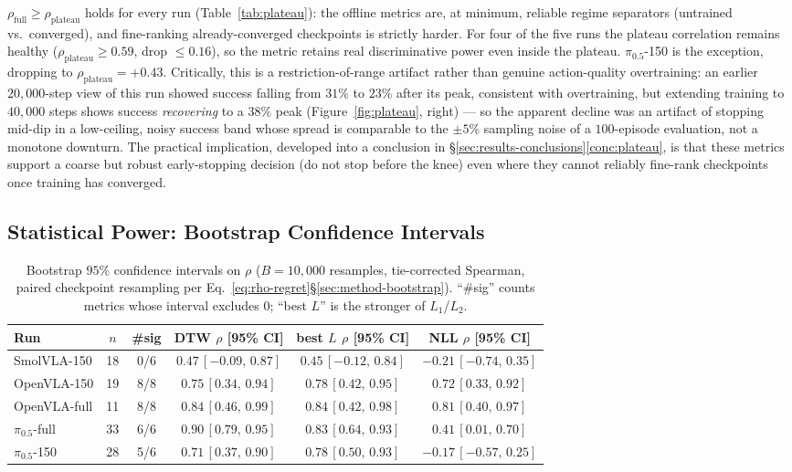 \documentclass[11pt]{article}
\numberwithin{equation}{section}
\numberwithin{table}{section}
\numberwithin{figure}{section}
\begin{document}
$\rho_{\mathrm{full}}\ge\rho_{\mathrm{plateau}}$ holds for every run (Table~\ref{tab:plateau}): the
offline metrics are, at minimum, reliable regime separators (untrained vs.\ converged), and fine-ranking
already-converged checkpoints is strictly harder. For four of the five runs the plateau correlation
remains healthy ($\rho_{\mathrm{plateau}}\ge0.59$, drop $\le0.16$), so the metric retains real
discriminative power even inside the plateau. $\pi_{0.5}$-150 is the exception, dropping to
$\rho_{\mathrm{plateau}}=+0.43$. Critically, this is a restriction-of-range artifact rather than genuine
action-quality overtraining: an earlier $20{,}000$-step view of this run showed success falling from
$31\%$ to $23\%$ after its peak, consistent with overtraining, but extending training to $40{,}000$
steps shows success \emph{recovering} to a $38\%$ peak (Figure~\ref{fig:plateau}, right) --- so the
apparent decline was an artifact of stopping mid-dip in a low-ceiling, noisy success band whose spread is
comparable to the $\pm5\%$ sampling noise of a $100$-episode evaluation, not a monotone downturn. The
practical implication, developed into a conclusion in \S\ref{sec:results-conclusions}\ref{conc:plateau},
is that these metrics support a coarse but robust early-stopping decision (do not stop before the knee)
even where they cannot reliably fine-rank checkpoints once training has converged.

\subsection{Statistical Power: Bootstrap Confidence Intervals}
\label{sec:results-bootstrap}

\begin{table}[h]
\centering
\caption{Bootstrap $95\%$ confidence intervals on $\rho$ ($B{=}10{,}000$ resamples, tie-corrected
Spearman, paired checkpoint resampling per Eq.~\ref{eq:rho-regret}\S\ref{sec:method-bootstrap}). ``\#sig''
counts metrics whose interval excludes $0$; ``best $L$'' is the stronger of $L_1$/$L_2$.}
\label{tab:bootstrap}
\begin{tabular}{lccccc}
\toprule
Run & $n$ & \#sig & DTW $\rho$ [95\% CI] & best $L$ $\rho$ [95\% CI] & NLL $\rho$ [95\% CI] \\
\midrule
SmolVLA-150      & 18 & 0/6 & $0.47\,[-0.09,\,0.87]$ & $0.45\,[-0.12,\,0.84]$ & $-0.21\,[-0.74,\,0.35]$ \\
OpenVLA-150      & 19 & 8/8 & $0.75\,[0.34,\,0.94]$  & $0.78\,[0.42,\,0.95]$  & $0.72\,[0.33,\,0.92]$ \\
OpenVLA-full     & 11 & 8/8 & $0.84\,[0.46,\,0.99]$  & $0.84\,[0.42,\,0.98]$  & $0.81\,[0.40,\,0.97]$ \\
$\pi_{0.5}$-full & 33 & 6/6 & $0.90\,[0.79,\,0.95]$  & $0.83\,[0.64,\,0.93]$  & $0.41\,[0.01,\,0.70]$ \\
$\pi_{0.5}$-150  & 28 & 5/6 & $0.71\,[0.37,\,0.90]$  & $0.78\,[0.50,\,0.93]$  & $-0.17\,[-0.57,\,0.25]$ \\
\bottomrule
\end{tabular}
\end{table}
\end{document}
